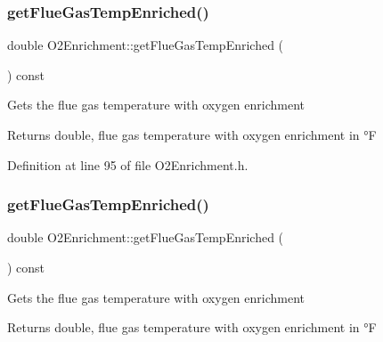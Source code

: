 \mbox{\label{class_o2_enrichment_ab69ee84a1b662e4c1f9a49d23acc6f00}} 
\subsubsection{\texorpdfstring{get\+Flue\+Gas\+Temp\+Enriched()}{getFlueGasTempEnriched()}\hspace{0.1cm}{\footnotesize\ttfamily [1/3]}}
{\footnotesize\ttfamily double O2\+Enrichment\+::get\+Flue\+Gas\+Temp\+Enriched (\begin{DoxyParamCaption}{ }\end{DoxyParamCaption}) const\hspace{0.3cm}{\ttfamily [inline]}}

Gets the flue gas temperature with oxygen enrichment \begin{DoxyReturn}{Returns}
double, flue gas temperature with oxygen enrichment in °F 
\end{DoxyReturn}


Definition at line 95 of file O2\+Enrichment.\+h.

\mbox{\label{class_o2_enrichment_ab69ee84a1b662e4c1f9a49d23acc6f00}} 
\subsubsection{\texorpdfstring{get\+Flue\+Gas\+Temp\+Enriched()}{getFlueGasTempEnriched()}\hspace{0.1cm}{\footnotesize\ttfamily [2/3]}}
{\footnotesize\ttfamily double O2\+Enrichment\+::get\+Flue\+Gas\+Temp\+Enriched (\begin{DoxyParamCaption}{ }\end{DoxyParamCaption}) const\hspace{0.3cm}{\ttfamily [inline]}}

Gets the flue gas temperature with oxygen enrichment \begin{DoxyReturn}{Returns}
double, flue gas temperature with oxygen enrichment in °F 
\end{DoxyReturn}


